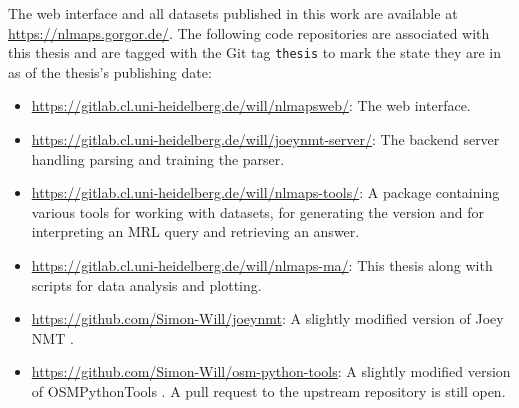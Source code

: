 The web interface and all datasets published in this work are available at
{\small\url{https://nlmaps.gorgor.de/}}. The following code repositories are
associated with this thesis and are tagged with the Git tag
{\small\texttt{thesis}} to mark the state they are in as of the thesis’s
publishing date:

\begin{itemize}
\item {\small\url{https://gitlab.cl.uni-heidelberg.de/will/nlmapsweb/}}: The web
  interface.
\item {\small\url{https://gitlab.cl.uni-heidelberg.de/will/joeynmt-server/}}:
  The backend server handling parsing and training the parser.
\item {\small\url{https://gitlab.cl.uni-heidelberg.de/will/nlmaps-tools/}}: A
  package containing various tools for working with \nlmaps{} datasets, for
  generating the \nlmapsthree{} version and for interpreting an MRL query and
  retrieving an answer.
\item {\small\url{https://gitlab.cl.uni-heidelberg.de/will/nlmaps-ma/}}: This
  thesis along with scripts for data analysis and plotting.
\item {\small\url{https://github.com/Simon-Will/joeynmt}}: A slightly modified
  version of Joey NMT \parencite{kreutzer-2019}.
\item {\small\url{https://github.com/Simon-Will/osm-python-tools}}: A slightly
  modified version of OSMPythonTools \parencite{mocnik-2017}. A pull request to
  the upstream repository is still open.
\end{itemize}

